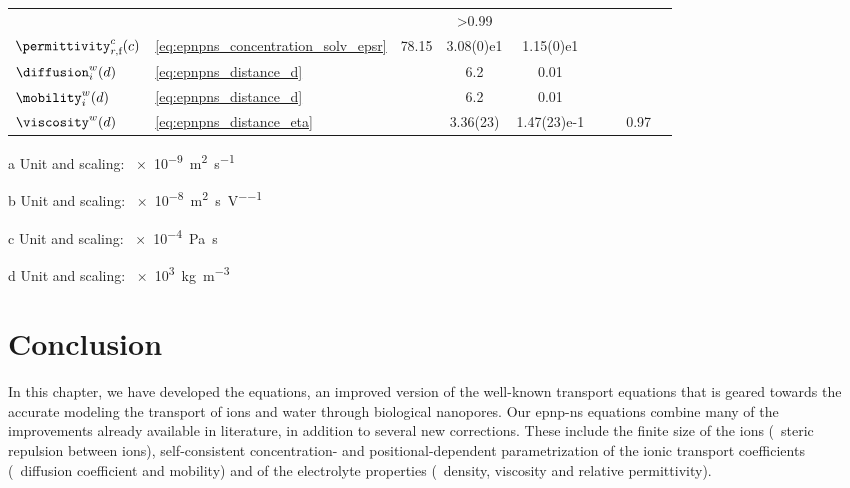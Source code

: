 \begin{landscape}
\begin{threeparttable}[p]
\begin{tabularx}{18cm}{@{}
            l l S[table-format=1.3] S[table-format=-1.2(2)e-1] S[table-format=-1.2(2)e-1]
            S[table-format=-1.2(2)e-1] S[table-format=-1.2(2)e-1] S[table-format=>1.2] l @{}}
      & & & >0.99 & \cite{Hai-Lang-1996} \\
      $\permittivity_{r,\text{f}}^c(c)$ & \cref{eq:epnpns_concentration_solv_epsr} & 78.15 & 3.08(0)e1 &
      1.15(0)e1 & & & & \cite{Buchner-1999,Gavish-2016} \\
      $\diffusion_{i}^w(d)$ & \cref{eq:epnpns_distance_d} & & 6.2 & 0.01 & & & &
      \cite{Makarov-1998,Simakov-2010,Pederson-2015} \\
      $\mobility_{i}^w(d)$ & \cref{eq:epnpns_distance_d} & & 6.2 & 0.01 & & & &
      \cite{Makarov-1998,Simakov-2010,Pederson-2015} \\
      $\viscosity^w(d)$ & \cref{eq:epnpns_distance_eta} & & 3.36(23) & 1.47(23)e-1 & & & 0.97 &
      \cite{Pronk-2014} \\
      \bottomrule
    \end{tabularx}
    \begin{tablenotes}
      \item[a] Unit and scaling: \SI{e-9}{\square\meter\per\second}
      \item[b] Unit and scaling: \SI{e-8}{\square\meter\per\second\per\volt}
      \item[c] Unit and scaling: \SI{e-4}{\pascal\second}
      \item[d] Unit and scaling: \SI{e3}{\kilo\gram\per\cubic\meter}
    \end{tablenotes}
  \end{threeparttable}
\end{landscape}
%


\section{Conclusion}
%
\label{sec:epnp-ns:conclusion}
%

In this chapter, we have developed the  equations, an improved version of the well-known
transport equations that is geared towards the accurate modeling the transport of ions and water through
biological nanopores. Our \gls{epnp-ns} equations combine many of the improvements already available in
literature, in addition to several new corrections. These include the finite size of the ions (\ie~steric
repulsion between ions), self-consistent concentration- and positional-dependent parametrization of the ionic
transport coefficients (\ie~diffusion coefficient and mobility) and of the electrolyte properties
(\ie~density, viscosity and relative permittivity).

